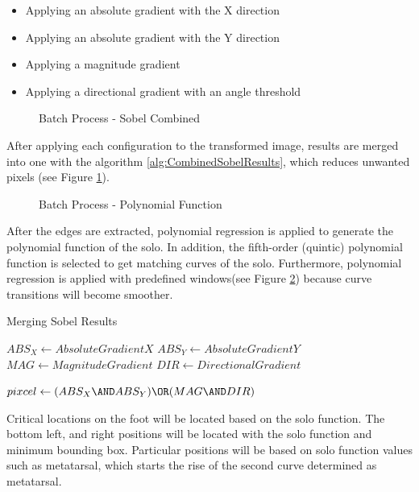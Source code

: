 \begin{itemize}
  \item Applying an absolute gradient with the X direction
  \item Applying an absolute gradient with the Y direction
  \item Applying a magnitude gradient
  \item Applying a directional gradient with an angle threshold 
\end{itemize}

\begin{figure}[htbp]
\centering
{}
\caption{Batch Process - Sobel Combined}
\label{fig:BatchProcessEdge}
\end{figure}

After applying each configuration to the transformed image, results are merged into one with the algorithm  \ref{alg:CombinedSobelResults}, which reduces unwanted pixels (see Figure \ref{fig:BatchProcessEdge}). 

\begin{figure}[htbp]
\centering
{}
\caption{Batch Process - Polynomial Function}
\label{fig:BatchProcessLine}
\end{figure}

After the edges are extracted, polynomial regression is applied to generate the polynomial function of the solo. In addition, the fifth-order (quintic) polynomial function is selected to get matching curves of the solo. Furthermore, polynomial regression is applied with predefined windows(see Figure \ref{fig:BatchProcessLine}) because curve transitions will become smoother.

\begin{algorithm}
\caption{Merging Sobel Results}\label{alg:CombinedSobelResults}
\begin{algorithmic}

\STATE $ABS_X \gets Absolute Gradient X$
\STATE $ABS_Y \gets Absolute Gradient Y$
\STATE $MAG \gets Magnitude Gradient$
\STATE $DIR \gets Directional Gradient$

    \STATE $pixcel \gets (ABS_X \AND ABS_Y) \OR (MAG \AND DIR)$
\ENDFOR

\end{algorithmic}
\end{algorithm}

Critical locations on the foot will be located based on the solo function. The bottom left, and right positions will be located with the solo function and minimum bounding box. Particular positions will be based on solo function values such as metatarsal, which starts the rise of the second curve determined as metatarsal.

